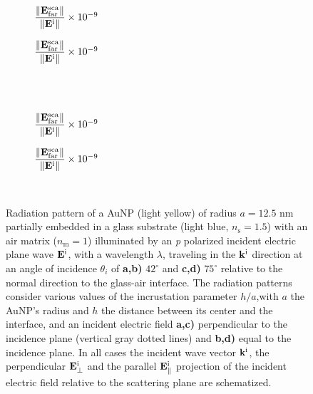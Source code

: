 \begin{figure}[h!]
    \centering
    \def\svgwidth{.8\textwidth}
    \hspace*{-.2\textwidth}%
    \vspace*{-3.65em}%
        \begin{subfigure}{.4\textwidth}\caption{%
                    \footnotesize$\dfrac{\norm{\vb{E}^\text{sca}_\text{far}}}{\norm{\vb{E}^\text{i}}} \times 10^{-9}$  }\label{sfig:Far:Inc:p2:a}\end{subfigure}%
        \begin{subfigure}{.4\textwidth}\caption{%
                    \footnotesize$\dfrac{\norm{\vb{E}^\text{sca}_\text{far}}}{\norm{\vb{E}^\text{i}}} \times 10^{-9}$  }\label{sfig:Far:Inc:p2:b}\end{subfigure}\\
    \\[-.75em]
    \def\svgwidth{.8\textwidth}
    \hspace*{-.21\textwidth}%
    \vspace*{-.7em}%
        \begin{subfigure}{.4\textwidth}\caption{%
                    \footnotesize$\dfrac{\norm{\vb{E}^\text{sca}_\text{far}}}{\norm{\vb{E}^\text{i}}} \times 10^{-9}$  }\label{sfig:Far:Inc:p2:c}\end{subfigure}%
        \begin{subfigure}{.4\textwidth}\caption{%
                    \footnotesize$\dfrac{\norm{\vb{E}^\text{sca}_\text{far}}}{\norm{\vb{E}^\text{i}}} \times 10^{-9}$  }\label{sfig:Far:Inc:p2:d}\end{subfigure}\\
    \caption[  Radiation pattern of a AuNP supported on a substrate illuminated at oblique incidence ]{
    Radiation pattern of a AuNP (light yellow) of radius $a = 12.5$ nm partially embedded in a glass substrate (light blue, $n_\text{s} = 1.5$) with an air matrix ($n_\text{m} = 1$) illuminated by an \textit{p} polarized incident electric plane wave $\vb{E}^\text{i}$, with a wavelength $\lambda$, traveling in the $\vb{k}^\text{i}$ direction at an angle of incidence $\theta_i$ of \textbf{a,b)} $42^\circ$ and \textbf{c,d)} $75^\circ$ relative to the normal direction to the glass-air interface. The radiation patterns consider various values of the incrustation parameter $h/a$,with $a$ the AuNP's radius and $h$ the distance between its center and the interface, and an  incident electric field \textbf{a,c)} perpendicular to the incidence plane (vertical gray dotted lines) and \textbf{b,d)} equal to the incidence plane. In all cases the incident wave vector $\vb{k}^\text{i}$, the perpendicular $\vb{E}_\perp^\text{i}$ and the  parallel $\vb{E}_\parallel^\text{i}$ projection of the incident electric field relative to the scattering plane are schematized.%
    }
    \label{fig:Far:Inc:p2}
\end{figure}








